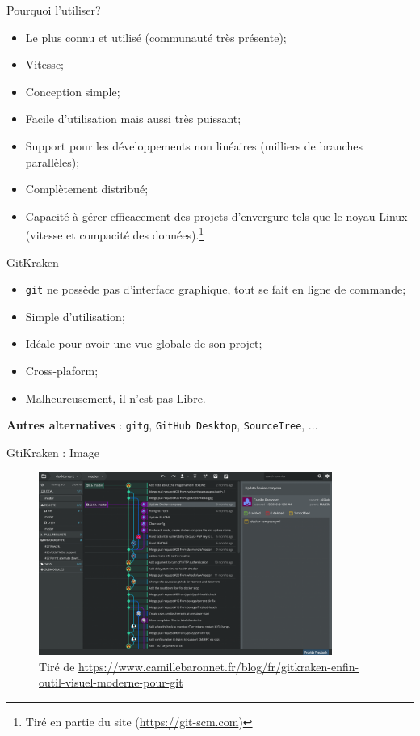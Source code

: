 \documentclass{beamer}
\begin{document}
\begin{frame}{Pourquoi l'utiliser?}
\begin{itemize}
    \item Le plus connu et utilisé (communauté très présente);
    \item Vitesse;
    \item Conception simple;
    \item Facile d'utilisation mais aussi très puissant;
    \item Support pour les développements non linéaires (milliers de branches parallèles);
    \item Complètement distribué;
    \item Capacité à gérer efficacement des projets d'envergure tels que le noyau Linux (vitesse et compacité des données).\footnote{Tiré en partie du site (\url{https://git-scm.com})}
\end{itemize}
\end{frame}

\begin{frame}{GitKraken}
\begin{itemize}
    \item \texttt{git} ne possède pas d'interface graphique, tout se fait en ligne de commande;
    \item Simple d'utilisation;
    \item Idéale pour avoir une vue globale de son projet;
    \item Cross-plaform;
    \item Malheureusement, il n'est pas Libre.
\end{itemize}

\textbf{Autres alternatives} : \texttt{gitg}, \texttt{GitHub Desktop}, \texttt{SourceTree}, ...
\end{frame}

\begin{frame}{GtiKraken : Image}
\begin{figure}
    \centering
    \includegraphics[height=6cm]{img/gitkraken.png}
    \caption{Tiré de \url{https://www.camillebaronnet.fr/blog/fr/gitkraken-enfin-outil-visuel-moderne-pour-git}}
\end{figure}
\end{frame}
\end{document}
